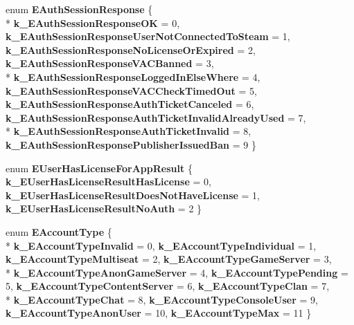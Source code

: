 \begin{DoxyCompactItemize}
\item 
\hypertarget{namespaceValve_1_1Steamworks_a084140370df88c8563129265cafb7431}{}enum {\bfseries E\+Auth\+Session\+Response} \{ \\*
{\bfseries k\+\_\+\+E\+Auth\+Session\+Response\+O\+K} = 0, 
{\bfseries k\+\_\+\+E\+Auth\+Session\+Response\+User\+Not\+Connected\+To\+Steam} = 1, 
{\bfseries k\+\_\+\+E\+Auth\+Session\+Response\+No\+License\+Or\+Expired} = 2, 
{\bfseries k\+\_\+\+E\+Auth\+Session\+Response\+V\+A\+C\+Banned} = 3, 
\\*
{\bfseries k\+\_\+\+E\+Auth\+Session\+Response\+Logged\+In\+Else\+Where} = 4, 
{\bfseries k\+\_\+\+E\+Auth\+Session\+Response\+V\+A\+C\+Check\+Timed\+Out} = 5, 
{\bfseries k\+\_\+\+E\+Auth\+Session\+Response\+Auth\+Ticket\+Canceled} = 6, 
{\bfseries k\+\_\+\+E\+Auth\+Session\+Response\+Auth\+Ticket\+Invalid\+Already\+Used} = 7, 
\\*
{\bfseries k\+\_\+\+E\+Auth\+Session\+Response\+Auth\+Ticket\+Invalid} = 8, 
{\bfseries k\+\_\+\+E\+Auth\+Session\+Response\+Publisher\+Issued\+Ban} = 9
 \}\label{namespaceValve_1_1Steamworks_a084140370df88c8563129265cafb7431}

\item 
\hypertarget{namespaceValve_1_1Steamworks_a4551b19c96690358095d423a33d1337f}{}enum {\bfseries E\+User\+Has\+License\+For\+App\+Result} \{ {\bfseries k\+\_\+\+E\+User\+Has\+License\+Result\+Has\+License} = 0, 
{\bfseries k\+\_\+\+E\+User\+Has\+License\+Result\+Does\+Not\+Have\+License} = 1, 
{\bfseries k\+\_\+\+E\+User\+Has\+License\+Result\+No\+Auth} = 2
 \}\label{namespaceValve_1_1Steamworks_a4551b19c96690358095d423a33d1337f}

\item 
\hypertarget{namespaceValve_1_1Steamworks_a8b56516bb01d7d063627b4229106b155}{}enum {\bfseries E\+Account\+Type} \{ \\*
{\bfseries k\+\_\+\+E\+Account\+Type\+Invalid} = 0, 
{\bfseries k\+\_\+\+E\+Account\+Type\+Individual} = 1, 
{\bfseries k\+\_\+\+E\+Account\+Type\+Multiseat} = 2, 
{\bfseries k\+\_\+\+E\+Account\+Type\+Game\+Server} = 3, 
\\*
{\bfseries k\+\_\+\+E\+Account\+Type\+Anon\+Game\+Server} = 4, 
{\bfseries k\+\_\+\+E\+Account\+Type\+Pending} = 5, 
{\bfseries k\+\_\+\+E\+Account\+Type\+Content\+Server} = 6, 
{\bfseries k\+\_\+\+E\+Account\+Type\+Clan} = 7, 
\\*
{\bfseries k\+\_\+\+E\+Account\+Type\+Chat} = 8, 
{\bfseries k\+\_\+\+E\+Account\+Type\+Console\+User} = 9, 
{\bfseries k\+\_\+\+E\+Account\+Type\+Anon\+User} = 10, 
{\bfseries k\+\_\+\+E\+Account\+Type\+Max} = 11
 \}\label{namespaceValve_1_1Steamworks_a8b56516bb01d7d063627b4229106b155}


\end{DoxyCompactItemize}
